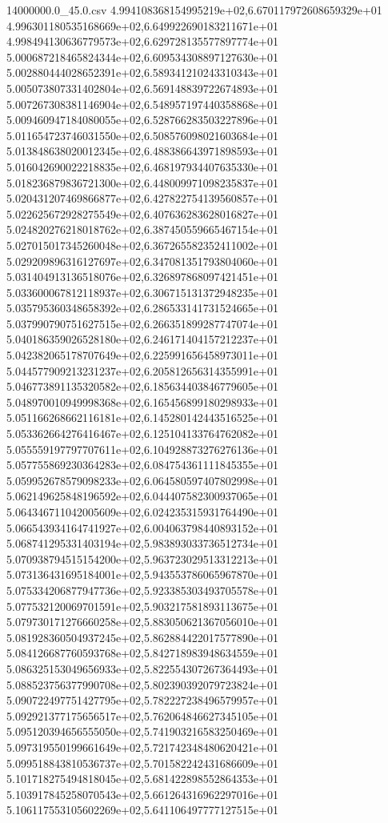 \begin{filecontents*}{14000000.0_45.0.csv}
4.994108368154995219e+02,6.670117972608659329e+01
4.996301180535168669e+02,6.649922690183211671e+01
4.998494130636779573e+02,6.629728135577897774e+01
5.000687218465824344e+02,6.609534308897127630e+01
5.002880444028652391e+02,6.589341210243310343e+01
5.005073807331402804e+02,6.569148839722674893e+01
5.007267308381146904e+02,6.548957197440358868e+01
5.009460947184080055e+02,6.528766283503227896e+01
5.011654723746031550e+02,6.508576098021603684e+01
5.013848638020012345e+02,6.488386643971898593e+01
5.016042690022218835e+02,6.468197934407635330e+01
5.018236879836721300e+02,6.448009971098235837e+01
5.020431207469866877e+02,6.427822754139560857e+01
5.022625672928275549e+02,6.407636283628016827e+01
5.024820276218018762e+02,6.387450559665467154e+01
5.027015017345260048e+02,6.367265582352411002e+01
5.029209896316127697e+02,6.347081351793804060e+01
5.031404913136518076e+02,6.326897868097421451e+01
5.033600067812118937e+02,6.306715131372948235e+01
5.035795360348658392e+02,6.286533141731524665e+01
5.037990790751627515e+02,6.266351899287747074e+01
5.040186359026528180e+02,6.246171404157212237e+01
5.042382065178707649e+02,6.225991656458973011e+01
5.044577909213231237e+02,6.205812656314355991e+01
5.046773891135320582e+02,6.185634403846779605e+01
5.048970010949998368e+02,6.165456899180298933e+01
5.051166268662116181e+02,6.145280142443516525e+01
5.053362664276416467e+02,6.125104133764762082e+01
5.055559197797707611e+02,6.104928873276276136e+01
5.057755869230364283e+02,6.084754361111845355e+01
5.059952678579098233e+02,6.064580597407802998e+01
5.062149625848196592e+02,6.044407582300937065e+01
5.064346711042005609e+02,6.024235315931764490e+01
5.066543934164741927e+02,6.004063798440893152e+01
5.068741295331403194e+02,5.983893033736512734e+01
5.070938794515154200e+02,5.963723029513312213e+01
5.073136431695184001e+02,5.943553786065967870e+01
5.075334206877947736e+02,5.923385303493705578e+01
5.077532120069701591e+02,5.903217581893113675e+01
5.079730171276660258e+02,5.883050621367056010e+01
5.081928360504937245e+02,5.862884422017577890e+01
5.084126687760593768e+02,5.842718983948634559e+01
5.086325153049656933e+02,5.822554307267364493e+01
5.088523756377990708e+02,5.802390392079723824e+01
5.090722497751427795e+02,5.782227238496579957e+01
5.092921377175656517e+02,5.762064846627345105e+01
5.095120394656555050e+02,5.741903216583250469e+01
5.097319550199661649e+02,5.721742348480620421e+01
5.099518843810536737e+02,5.701582242431686609e+01
5.101718275494818045e+02,5.681422898552864353e+01
5.103917845258070543e+02,5.661264316962297016e+01
5.106117553105602269e+02,5.641106497777127515e+01

\end{filecontents*}
